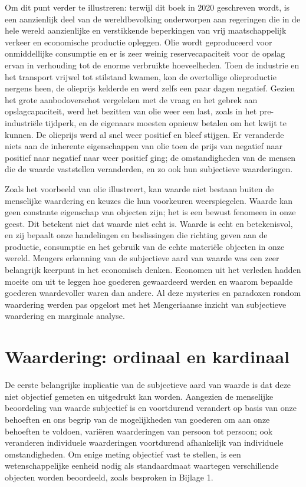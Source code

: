 Om dit punt verder te illustreren: terwijl dit boek in 2020 geschreven wordt, is een aanzienlijk deel van de wereldbevolking onderworpen aan regeringen die in de hele wereld aanzienlijke en verstikkende beperkingen van vrij maatschappelijk verkeer en economische productie opleggen. Olie wordt geproduceerd voor onmiddellijke consumptie en er is zeer weinig reservecapaciteit voor de opslag ervan in verhouding tot de enorme verbruikte hoeveelheden. Toen de industrie en het transport vrijwel tot stilstand kwamen, kon de overtollige olieproductie nergens heen, de olieprijs kelderde en werd zelfs een paar dagen negatief. Gezien het grote aanbodoverschot vergeleken met de vraag en het gebrek aan opslagcapaciteit, werd het bezitten van olie weer een last, zoals in het pre-industriële tijdperk, en de eigenaars moesten opnieuw betalen om het kwijt te kunnen. De olieprijs werd al snel weer positief en bleef stijgen. Er veranderde niets aan de inherente eigenschappen van olie toen de prijs van negatief naar positief naar negatief naar weer positief ging; de omstandigheden van de mensen die de waarde vaststellen veranderden, en zo ook hun subjectieve waarderingen.

Zoals het voorbeeld van olie illustreert, kan waarde niet bestaan buiten de menselijke waardering en keuzes die hun voorkeuren weerspiegelen. Waarde kan geen constante eigenschap van objecten zijn; het is een bewust fenomeen in onze geest. Dit betekent niet dat waarde niet echt is. Waarde is echt en betekenisvol, en zij bepaalt onze handelingen en beslissingen die richting geven aan de productie, consumptie en het gebruik van de echte materiële objecten in onze wereld. Mengers erkenning van de subjectieve aard van waarde was een zeer belangrijk keerpunt in het economisch denken. Economen uit het verleden hadden moeite om uit te leggen hoe goederen gewaardeerd werden en waarom bepaalde goederen waardevoller waren dan andere. Al deze mysteries en paradoxen rondom waardering werden pas opgelost met het Mengeriaanse inzicht van subjectieve waardering en marginale analyse.

\section{Waardering: ordinaal en kardinaal}

De eerste belangrijke implicatie van de subjectieve aard van waarde is dat deze niet objectief gemeten en uitgedrukt kan worden. Aangezien de menselijke beoordeling van waarde subjectief is en voortdurend verandert op basis van onze behoeften en ons begrip van de mogelijkheden van goederen om aan onze behoeften te voldoen, variëren waarderingen van persoon tot persoon; ook veranderen individuele waarderingen voortdurend afhankelijk van individuele omstandigheden. Om enige meting objectief vast te stellen, is een wetenschappelijke eenheid nodig als standaardmaat waartegen verschillende objecten worden beoordeeld, zoals besproken in Bijlage 1.

